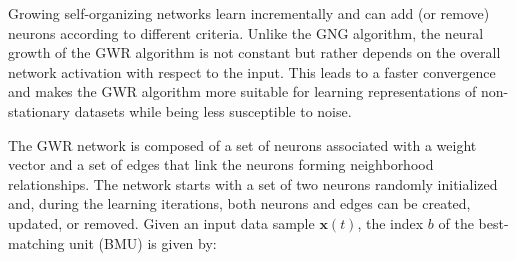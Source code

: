 \documentclass[5p,times]{elsarticle}
\begin{document}
Growing self-organizing networks learn incrementally and can add (or remove) neurons according to different criteria.
Unlike the GNG algorithm, the neural growth of the GWR algorithm is not constant but rather depends on the overall network activation with respect to the input. 
This leads to a faster convergence and makes the GWR algorithm more suitable for learning representations of non-stationary datasets while being less susceptible to noise.

The GWR network is composed of a set of neurons associated with a weight vector and a set of edges that link the neurons forming neighborhood relationships.
The network starts with a set of two neurons randomly initialized and, during the learning iterations, both neurons and edges can be created, updated, or removed.
Given an input data sample $\textbf{x}(t)$, the index $b$ of the best-matching unit (BMU) is given by:
\end{document}
